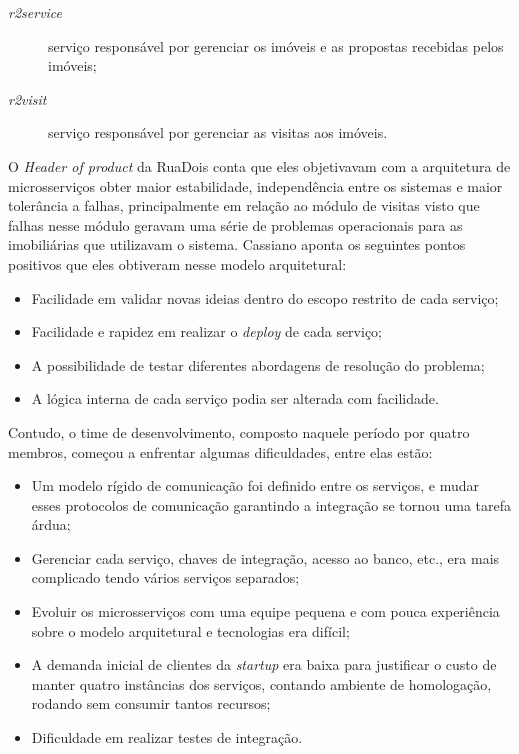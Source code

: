 \begin{description}
    \item [\textit{r2service}] serviço responsável por gerenciar os imóveis e as propostas recebidas
        pelos imóveis;
    \item [\textit{r2visit}] serviço responsável por gerenciar as visitas aos imóveis.
\end{description}

O \textit{Header of product} da RuaDois conta que eles objetivavam com a arquitetura de
microsserviços obter maior estabilidade, independência entre os sistemas e maior tolerância a falhas,
principalmente em relação ao módulo de visitas visto que falhas nesse módulo geravam uma série de
problemas operacionais para as imobiliárias que utilizavam o sistema. Cassiano aponta os seguintes
pontos positivos que eles obtiveram nesse modelo arquitetural:

\begin{itemize}
    \item Facilidade em validar novas ideias dentro do escopo restrito de cada serviço;
    \item Facilidade e rapidez em realizar o \textit{deploy} de cada serviço;
    \item A possibilidade de testar diferentes abordagens de resolução do problema;
    \item A lógica interna de cada serviço podia ser alterada com facilidade.
\end{itemize}

Contudo, o time de desenvolvimento, composto naquele período por quatro membros, começou a enfrentar
algumas dificuldades, entre elas estão:

\begin{itemize}
    \item Um modelo rígido de comunicação foi definido entre os serviços, e mudar esses protocolos
        de comunicação garantindo a integração se tornou uma tarefa árdua; 
    \item Gerenciar cada serviço, chaves de integração, acesso ao banco, etc., era mais complicado
        tendo vários serviços separados;
    \item Evoluir os microsserviços com uma equipe pequena e com pouca experiência sobre o modelo
        arquitetural e tecnologias era difícil;
    \item A demanda inicial de clientes da \textit{startup} era baixa para justificar o custo de
        manter quatro instâncias dos serviços, contando ambiente de homologação, rodando sem
        consumir tantos recursos;
    \item Dificuldade em realizar testes de integração.
\end{itemize}

